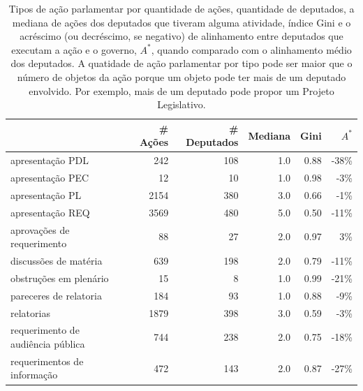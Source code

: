 \documentclass[12pt,a4paper]{article}
\begin{document}
\begin{table}
\caption{Tipos de ação parlamentar por quantidade de ações, quantidade de deputados, a mediana de ações dos deputados que tiveram alguma atividade, índice Gini e o acréscimo (ou decréscimo, se negativo) de alinhamento entre deputados que executam a ação e o governo, $A^*$, quando comparado com o alinhamento médio dos deputados. A quatidade de ação parlamentar por tipo pode ser maior que o número de objetos da ação porque um objeto pode ter mais de um deputado envolvido. Por exemplo, mais de um deputado pode propor um Projeto Legislativo.}
{\footnotesize
\begin{center}
\begin{tabular}{lrrrrr}
\toprule
{} &  \# Ações &  \# Deputados &  Mediana &  Gini & $A^*$\\
\midrule
apresentação PDL                  &      242 &          108 &      1.0 &  0.88 &  -38\% \\
apresentação PEC                  &       12 &           10 &      1.0 &  0.98 &  -3\% \\
apresentação PL                   &     2154 &          380 &      3.0 &  0.66 &  -1\% \\
apresentação REQ                  &     3569 &          480 &      5.0 &  0.50 &  -11\% \\
aprovações de requerimento        &       88 &           27 &      2.0 &  0.97 &   3\% \\
discussões de matéria             &      639 &          198 &      2.0 &  0.79 &  -11\% \\
obstruções em plenário            &       15 &            8 &      1.0 &  0.99 &  -21\% \\
pareceres de relatoria            &      184 &           93 &      1.0 &  0.88 &  -9\% \\
relatorias                        &     1879 &          398 &      3.0 &  0.59 &  -3\% \\
requerimento de audiência pública &      744 &          238 &      2.0 &  0.75 &  -18\% \\
requerimentos de informação       &      472 &          143 &      2.0 &  0.87 &  -27\% \\
\bottomrule
\end{tabular}
\end{center}
}
\label{tab:atividade-parlamentar-acao}
\end{table}
\end{document}
